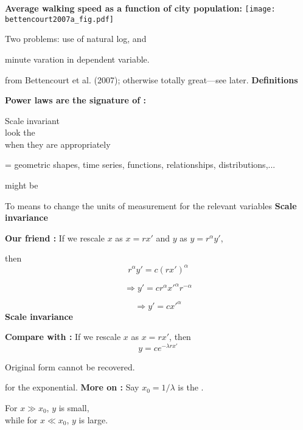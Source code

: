   \textbf{Average walking speed as a function of city population:}
      \texttt{[image: bettencourt2007a\_fig.pdf]}
      
      Two problems:
        use of natural log, and
       
        minute varation in dependent variable.
    
     
      {\small from Bettencourt et al. (2007)\cite{bettencourt2007a};
        otherwise totally great---see later.}
  \textbf{Definitions}
    
    
    \textbf{Power laws are the signature of :}
      \bigskip

      Scale invariant \\
      look the \\ 
      when they are 
      appropriately 
  

  \bigskip
    
     
       = geometric shapes, time series, functions, relationships, distributions,...
     
       might be 
     
      To  means to change the units
      of measurement for the relevant variables
  \textbf{Scale invariance}

  \textbf{Our friend :}
      If we rescale $x$ as $x = rx'$ and $y$ as $y = r^\alpha y'$,
    
      then
      $$r^\alpha y' = c (rx')^{\alpha}$$
    
      $$\Rightarrow y' = c r^{\alpha} {x'}^{\alpha}r^{-\alpha}$$
    
      $$\Rightarrow y' = c {x'}^{\alpha}$$
  \textbf{Scale invariance}

  \textbf{Compare with :}
      If we rescale $x$ as $x = rx'$, then
      $$ y = c e^{-\lambda rx'} $$
     
      Original form cannot be recovered.
     
       for the exponential.
  \textbf{More on :}
      Say $x_0 = 1/\lambda$ is the .
     
      For $x \gg x_0$, $y$ is small,\\
      while for $x \ll x_0$, $y$ is large.

